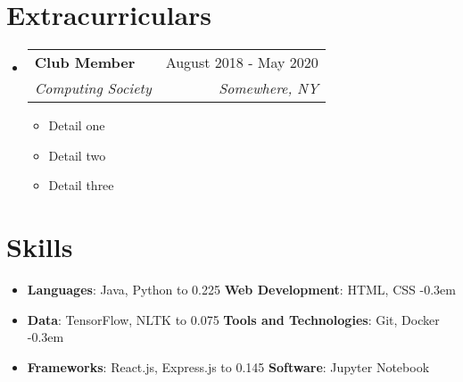\documentclass[letterpaper, 10pt]{article}
\makeatletter
\newcommand{\resumeItem}[2]{
	\item\small{
		\textbf{#1}{#2 \vspace{-3pt}}
	}
}
\newcommand{\resumeSubheading}[4]{
	\vspace{-1pt}\item[\label{}]
		\begin{tabular*}{0.97\textwidth}[t]{l@{\extracolsep{\fill}}r}
		\textbf{#1} & #2 \\
		\textit{\small#3} & \textit{\small #4} \\
		\end{tabular*}\vspace{-5pt}
}
\newcommand{\resumeSubHeadingListStart}{\begin{itemize}[leftmargin=* \label{}]}
\newcommand{\resumeSubHeadingListEnd}{\end{itemize}}
\newcommand{\resumeItemListStart}{\begin{itemize}\vspace{2pt}}
\newcommand{\resumeItemListEnd}{\end{itemize}\vspace{-5pt}}
\makeatother
\begin{document}
                                 \section{Extracurriculars}
                                     \resumeSubHeadingListStart
								\resumeSubheading
									{Club Member}{August 2018 - May 2020}
									{Computing Society}{Somewhere, NY}
										\resumeItemListStart
											\resumeItem{}{Detail one}
											\resumeItem{}{Detail two}
											\resumeItem{}{Detail three}
										\resumeItemListEnd
							\resumeSubHeadingListEnd

                 \section{Skills}
                     \resumeSubHeadingListStart
						\itemsep-0.3em
                         \item[]{
                                 \textbf{Languages}{: Java, Python}
                                 \noindent\hbox to 0.225 \textwidth{}
                                 \textbf{Web Development}{: HTML, CSS}
                         }
                     	\itemsep-0.3em
                         \item[]{
                             \textbf{Data}{: TensorFlow, NLTK}
                                 \noindent\hbox to 0.075 \textwidth{}
                                 \textbf{Tools and Technologies}{: Git, Docker}
                         }
                     	\itemsep-0.3em
                         \item[]{
                             \textbf{Frameworks}{: React.js, Express.js}
                             \noindent\hbox to 0.145 \textwidth{}
                                 \textbf{Software}{: Jupyter Notebook}
                         }
                 	\resumeSubHeadingListEnd
\end{document}
